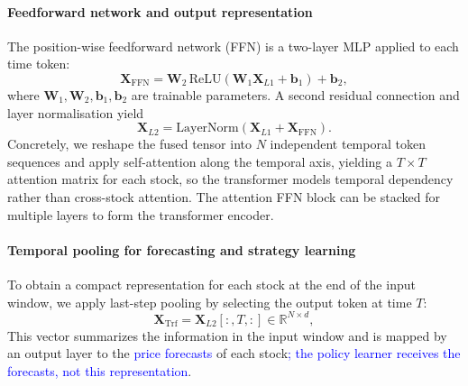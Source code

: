 \documentclass[pdflatex,sn-mathphys-num]{sn-jnl}%
\theoremstyle{thmstyleone}%
\theoremstyle{thmstyletwo}%
\theoremstyle{thmstylethree}%
\begin{document}
\paragraph{Feedforward network and output representation}
The position-wise feedforward network (FFN) is a two-layer MLP applied to each time token:
\begin{equation}
\mathbf{X}_{\mathrm{FFN}}
=
\mathbf{W}_{2}\,\mathrm{ReLU}\!\left(\mathbf{W}_{1}\mathbf{X}_{L1}+\mathbf{b}_{1}\right)
+\mathbf{b}_{2},
\label{eq:ffn}
\end{equation}
where $\mathbf{W}_{1},\mathbf{W}_{2},\mathbf{b}_{1},\mathbf{b}_{2}$ are trainable parameters. 
A second residual connection and layer normalisation yield
\begin{equation}
\mathbf{X}_{L2}=\mathrm{LayerNorm}\!\left(\mathbf{X}_{L1}+\mathbf{X}_{\mathrm{FFN}}\right).
\label{eq:ln2}
\end{equation}
Concretely, we reshape the fused tensor into $N$ independent temporal token sequences and apply self-attention along the temporal axis, yielding a
$T \times T$ attention matrix for each stock, so the transformer models temporal dependency rather than cross-stock attention.
The attention FFN block can be stacked for multiple layers to form the transformer encoder.

\paragraph{Temporal pooling for forecasting and strategy learning}
To obtain a compact representation for each stock at the end of the input window, we apply last-step pooling by selecting the output token at time $T$:
\begin{equation}
\mathbf{X}_{\mathrm{Trf}}
=
\mathbf{X}_{L2}[:,T,:]
\in\mathbb{R}^{N\times d},
\label{eq:last_step_re}
\end{equation}
This vector summarizes the information in the input window and is mapped by an output layer to the \textcolor{blue}{price forecasts} of each stock\textcolor{blue}{; the policy learner receives the forecasts, not this representation}.
\end{document}
